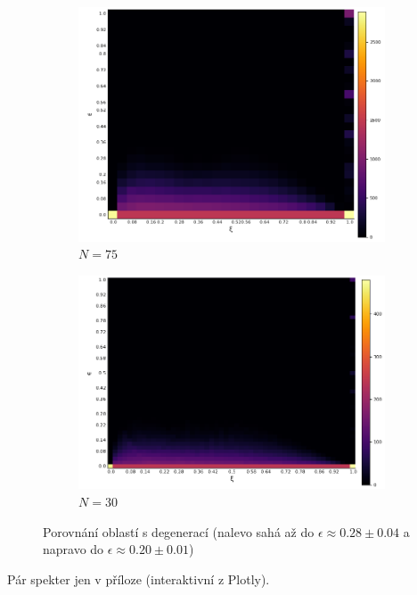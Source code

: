 \documentclass{article}
\begin{document}
  \begin{figure}[H]
    \centering
    \begin{subfigure}{.5\textwidth}
      \centering
      \includegraphics[width=.95\linewidth]{Deg.png}
      \caption{$N = 75$}
      \label{fig:sub1}
    \end{subfigure}%
    \begin{subfigure}{.5\textwidth}
      \centering
      \includegraphics[width=1.05\linewidth]{Deg2.png}
      \caption{$N = 30$}
      \label{fig:sub2}
    \end{subfigure}
    \caption{Porovnání oblastí s degenerací (nalevo sahá až do $\epsilon \approx 0.28 \pm 0.04$ a napravo do $\epsilon \approx 0.20 \pm 0.01$)}
    \label{fig:test}
    \end{figure}


Pár spekter jen v příloze (interaktivní z Plotly).
\end{document}
